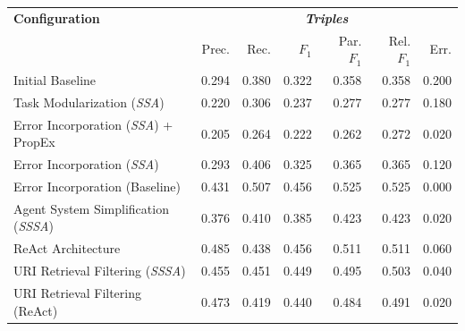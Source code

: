 \documentclass[a4paper,oneside,bibliography=totoc]{scrbook}
\begin{document}
\begin{table}[h]
  \centering
  \begin{tabular}{p{5cm}|rrrrrr}
    \toprule
    \textbf{Configuration}                                & \multicolumn{6}{c}{\textit{\textbf{Triples}}}                                                                                      \\
                                                          & Prec.                                         & Rec.           & $F_1$          & Par. $F_1$     & Rel. $F_1$     & Err.           \\
    \midrule
    Initial Baseline                                      & 0.294                                         & 0.380          & 0.322          & 0.358          & 0.358          & 0.200          \\
    Task Modularization (\textit{\ac{SSA}})               & 0.220                                         & 0.306          & 0.237          & 0.277          & 0.277          & 0.180          \\
    Error Incorporation (\textit{\ac{SSA}}) + \ac{PropEx} & 0.205                                         & 0.264          & 0.222          & 0.262          & 0.272          & 0.020          \\
    Error Incorporation (\textit{\ac{SSA}})               & 0.293                                         & 0.406          & 0.325          & 0.365          & 0.365          & 0.120          \\
    Error Incorporation (Baseline)                        & 0.431                                         & 0.507          & 0.456          & 0.525          & 0.525          & 0.000          \\
    Agent System Simplification (\textit{\ac{SSSA}})      & 0.376                                         & 0.410          & 0.385          & 0.423          & 0.423          & 0.020          \\
    ReAct Architecture                                    & 0.485                                         & 0.438          & 0.456          & 0.511          & 0.511          & 0.060          \\
    \ac{URI} Retrieval Filtering (\textit{\ac{SSSA}})     & 0.455                                         & 0.451          & 0.449          & 0.495          & 0.503          & 0.040          \\
    \ac{URI} Retrieval Filtering (ReAct)                  & 0.473                                         & 0.419          & 0.440          & 0.484          & 0.491          & 0.020          \\

\end{tabular}
\end{table}
\end{document}
